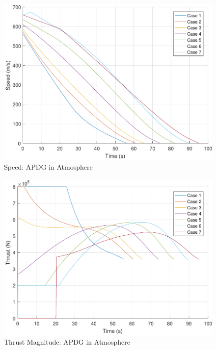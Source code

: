 \begin{figure}[H]
	\centering
	\begin{minipage}{4.3 in}
		\includegraphics[width=\linewidth]{Figures/spdpowatmo.pdf}
		\caption{Speed: APDG in Atmosphere \label{fig:spdpowatmo} }
	\end{minipage}
\end{figure}

\begin{figure}[H]
	\centering
	\begin{minipage}{4.3 in}
		\includegraphics[width=\linewidth]{Figures/thrpowatmo.pdf}
		\caption{Thrust Magnitude: APDG in Atmosphere \label{fig:thrpowatmo} }
	\end{minipage}
\end{figure}

